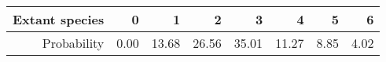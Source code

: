 \begin{table}[ht]
\centering
\begin{tabular}{rrrrrrrr}
  \hline
Extant species & 0  & 1 & 2 & 3 & 4 & 5 & 6 \\ 
  \hline
Probability & 0.00 & 13.68 & 26.56 & 35.01 & 11.27 & 8.85 & 4.02 \\ 
   \hline
\end{tabular}
\end{table}
